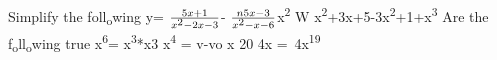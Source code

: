 \documentclass[12pt]{article}
\begin{document}
Simplify the foll\textsubscript{o}wing
\newline
y= $\frac{5x+1}{ x\textsuperscript{2}-2x-3 }$- $\frac{n 5x-3}{ x\textsuperscript{2}-x-6}
\newline
$x\textsuperscript{2 }W
\newline
x\textsuperscript{2}+3x+5-3x\textsuperscript{2}+1+x\textsuperscript{3}
\newline
Are the f\textsubscript{o}ll\textsubscript{o}wing true
\newline
x\textsuperscript{6}= x\textsuperscript{3}*x3
\newline
x\textsuperscript{4 }= v-vo
 x 20
\newline
4x = $\frac{}{}$4x\textsuperscript{19}
\end{document}
